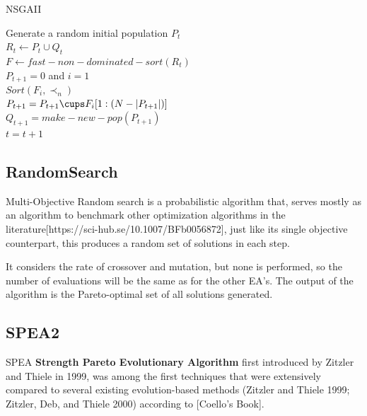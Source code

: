 \begin{algorithm}[H]
\label{nsgaii_alg}
\caption{NSGAII}
\SetAlgoLined
Generate a random initial population $P_t$\\
$R_t \gets P_t \cup Q_t$ \\
$F \gets fast-non-dominated-sort(R_t)$ \\
$P_{t+1} = 0$ and $i = 1$\\
$Sort(F_i, \prec_n)$\\
$P_{t+1} = P_{t+1} \cups F_i[1:(N-|P_{t+1}|)]$\\
$Q_{t+1} = make-new-pop(P_{t+1})$\\
$t = t+1$\\
\end{algorithm}


\subsection{RandomSearch}

Multi-Objective Random search is a probabilistic algorithm that, serves mostly as an algorithm to benchmark other optimization algorithms in the literature[https://sci-hub.se/10.1007/BFb0056872], just like its single objective counterpart, this produces a random set of solutions in each step. 

It considers the rate of crossover and mutation, but none is performed, so the number of evaluations will be the same as for the other EA's. The output of the algorithm is the Pareto-optimal set of all solutions generated.

\subsection{SPEA2}

SPEA \textbf{Strength Pareto Evolutionary Algorithm} first introduced by Zitzler and Thiele in 1999, was among the first techniques that were extensively compared to several existing evolution-based methods (Zitzler
and Thiele 1999; Zitzler, Deb, and Thiele 2000) according to [Coello's Book].

